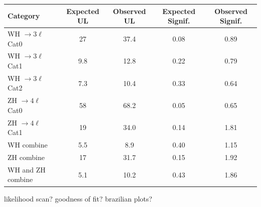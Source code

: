 \begin{table}[!htb]
  \captionsetup{justification=justified}
  \centering
  \begin{tabular}{|l|cc|cc|}
  \hline
   Category                 & Expected UL & Observed UL & Expected Signif.  & Observed Signif. \\
  \hline
  WH $\to 3\ell$  Cat0      & 27          & 37.4        & 0.08              & 0.89  \\
  WH $\to 3\ell$  Cat1      & 9.8         & 12.8        & 0.22              & 0.79  \\
  WH $\to 3\ell$  Cat2      & 7.3         & 10.4        & 0.33              & 0.64  \\
  \hline
  ZH $\to 4\ell$  Cat0      & 58          & 68.2        & 0.05              & 0.65  \\
  ZH $\to 4\ell$  Cat1      & 19          & 34.0        & 0.14              & 1.81  \\
  \hline
  WH combine                & 5.5         & 8.9         & 0.40              & 1.15 \\
  ZH combine                & 17          & 31.7        & 0.15              & 1.92 \\
  WH and ZH combine         & 5.1         & 10.2        & 0.43              & 1.86 \\
  \hline
  \end{tabular}
  \label{tab:vh_results}
\end{table}
  


likelihood scan?
goodness of fit?
brazilian plots?
